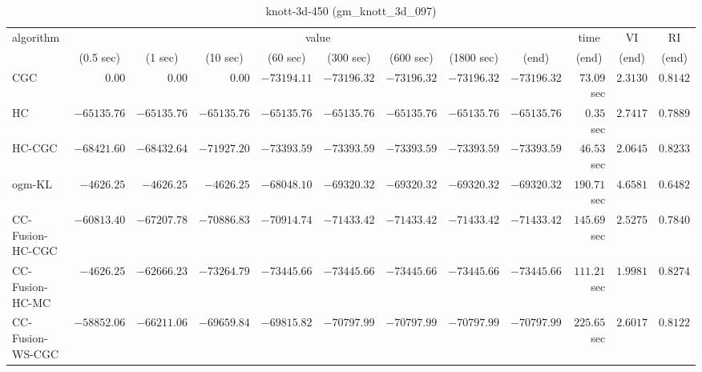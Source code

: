 \begin{table}[H]
\scriptsize
\centering
\caption{knott-3d-450 (gm\_knott\_3d\_097)}
\label{tab:anytimetable-knott-3d-450-gm-knott-3d-097}
\begin{tabular}{lrrrrrrrrrrr}
\toprule
           algorithm &                                   \multicolumn{8}{c}{value} & \multicolumn{1}{c}{time}    & \multicolumn{1}{c}{VI}  & \multicolumn{1}{c}{RI} \\  
\cmidrule(lr){2-9}\cmidrule(lr){10-10} \cmidrule(lr){11-11} \cmidrule(lr){12-12}   
                     & \multicolumn{1}{c}{(0.5 sec)} & \multicolumn{1}{c}{(1 sec)} & \multicolumn{1}{c}{(10 sec)} & \multicolumn{1}{c}{(60 sec)} & \multicolumn{1}{c}{(300 sec)} & \multicolumn{1}{c}{(600 sec)} & \multicolumn{1}{c}{(1800 sec)} & \multicolumn{1}{c}{(end)} & \multicolumn{1}{c}{(end)}    & \multicolumn{1}{c}{(end)}   & \multicolumn{1}{c}{(end)}  \\ \midrule 
                 CGC & $         0.00$ & $         0.00$ & $         0.00$ & $    -73194.11$ & $    -73196.32$ & $    -73196.32$ & $    -73196.32$ & $    -73196.32$ & $        73.09$ sec    & $       2.3130$  & $       0.8142$ \\ 
                  HC & $    -65135.76$ & $    -65135.76$ & $    -65135.76$ & $    -65135.76$ & $    -65135.76$ & $    -65135.76$ & $    -65135.76$ & $    -65135.76$ & $         0.35$ sec    & $       2.7417$  & $       0.7889$ \\ 
              HC-CGC & $    -68421.60$ & $    -68432.64$ & $    -71927.20$ & $    -73393.59$ & $    -73393.59$ & $    -73393.59$ & $    -73393.59$ & $    -73393.59$ & $        46.53$ sec    & $       2.0645$  & $       0.8233$ \\ 
              ogm-KL & $     -4626.25$ & $     -4626.25$ & $     -4626.25$ & $    -68048.10$ & $    -69320.32$ & $    -69320.32$ & $    -69320.32$ & $    -69320.32$ & $       190.71$ sec    & $       4.6581$  & $       0.6482$ \\ 
    CC-Fusion-HC-CGC & $    -60813.40$ & $    -67207.78$ & $    -70886.83$ & $    -70914.74$ & $    -71433.42$ & $    -71433.42$ & $    -71433.42$ & $    -71433.42$ & $       145.69$ sec    & $       2.5275$  & $       0.7840$ \\ 
     CC-Fusion-HC-MC & $     -4626.25$ & $    -62666.23$ & $    -73264.79$ & $    -73445.66$ & $    -73445.66$ & $    -73445.66$ & $    -73445.66$ & $    -73445.66$ & $       111.21$ sec    & $       1.9981$  & $       0.8274$ \\ 
    CC-Fusion-WS-CGC & $    -58852.06$ & $    -66211.06$ & $    -69659.84$ & $    -69815.82$ & $    -70797.99$ & $    -70797.99$ & $    -70797.99$ & $    -70797.99$ & $       225.65$ sec    & $       2.6017$  & $       0.8122$ \\ 

\end{tabular}
\end{table}
